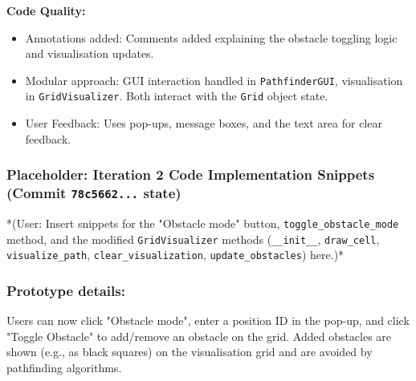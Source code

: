 \textbf{Code Quality:}
\begin{itemize}
	\item Annotations added: Comments added explaining the obstacle toggling logic and visualisation updates.
	\item Modular approach: GUI interaction handled in \verb|PathfinderGUI|, visualisation in \verb|GridVisualizer|. Both interact with the \verb|Grid| object state.
	\item User Feedback: Uses pop-ups, message boxes, and the text area for clear feedback.
\end{itemize}

\newpage
\subsubsection*{Placeholder: Iteration 2 Code Implementation Snippets (Commit \verb|78c5662...| state)}
*(User: Insert snippets for the "Obstacle mode" button, \verb|toggle_obstacle_mode| method, and the modified \verb|GridVisualizer| methods (\verb|__init__|, \verb|draw_cell|, \verb|visualize_path|, \verb|clear_visualization|, \verb|update_obstacles|) here.)*
\newpage

\subsubsection{Prototype details:}
Users can now click "Obstacle mode", enter a position ID in the pop-up, and click "Toggle Obstacle" to add/remove an obstacle on the grid. Added obstacles are shown (e.g., as black squares) on the visualisation grid and are avoided by pathfinding algorithms.

